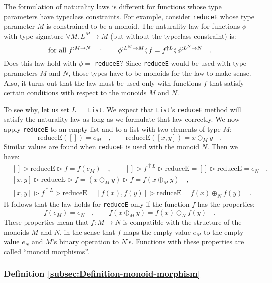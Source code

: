 The formulation of naturality laws is different for functions whose
type parameters have typeclass constraints. For example, consider
\lstinline!reduceE! whose type parameter $M$ is constrained to be
a monoid. The naturality law for functions $\phi$ with type signature
$\forall M.\,L^{M}\rightarrow M$ (but without the typeclass constraint)
is:
\[
\text{for all }f^{:M\rightarrow N}\quad:\quad\quad\phi^{:L^{M}\rightarrow M}\bef f=f^{\uparrow L}\bef\phi^{:L^{N}\rightarrow N}\quad.
\]
Does this law hold with $\phi=$ \lstinline!reduceE!? Since \lstinline!reduceE!
would be used with type parameters $M$ and $N$, those types have
to be monoids for the law to make sense. Also, it turns out that the
law must be used only with functions $f$ that satisfy certain conditions
with respect to the monoids $M$ and $N$. 

To see why, let us set $L=$ \lstinline!List!. We expect that \lstinline!List!\textsf{'}s
\lstinline!reduceE! method will satisfy the naturality law as long
as we formulate that law correctly. We now apply \lstinline!reduceE!
to an empty list and to a list with two elements of type $M$:
\[
\text{reduceE}\left(\left[\right]\right)=e_{M}\quad,\quad\quad\text{reduceE}\left(\left[x,y\right]\right)=x\oplus_{M}y\quad.
\]
Similar values are found when \lstinline!reduceE! is used with the
monoid $N$. Then we have:
\begin{align*}
 & \left[\right]\triangleright\text{reduceE}\triangleright f=f(e_{M})\quad,\quad\quad\left[\right]\triangleright f^{\uparrow L}\triangleright\text{reduceE}=\left[\right]\triangleright\text{reduceE}=e_{N}\quad,\\
 & \left[x,y\right]\triangleright\text{reduceE}\triangleright f=(x\oplus_{M}y)\triangleright f=f(x\oplus_{M}y)\quad,\\
 & \left[x,y\right]\triangleright f^{\uparrow L}\triangleright\text{reduceE}=\left[f(x),f(y)\right]\triangleright\text{reduceE}=f(x)\oplus_{N}f(y)\quad.
\end{align*}
It follows that the law holds for \lstinline!reduceE! only if the
function $f$ has the properties: 
\[
f(e_{M})=e_{N}\quad,\quad\quad f(x\oplus_{M}y)=f(x)\oplus_{N}f(y)\quad.
\]
These properties mean that $f:M\rightarrow N$ is compatible with
the structure of the monoids $M$ and $N$, in the sense that $f$
maps the empty value $e_{M}$ to the empty value $e_{N}$ and $M$\textsf{'}s
binary operation to $N$\textsf{'}s. Functions with these properties are called
\textsf{``}monoid morphisms\textsf{''}.

\subsubsection{Definition \label{subsec:Definition-monoid-morphism}\ref{subsec:Definition-monoid-morphism}}

